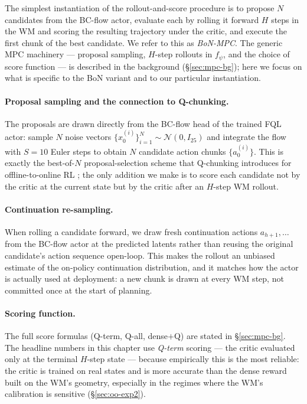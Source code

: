 The simplest instantiation of the rollout-and-score procedure is to propose $N$ candidates from the BC-flow actor, evaluate each by rolling it forward $H$ steps in the WM and scoring the resulting trajectory under the critic, and execute the first chunk of the best candidate. We refer to this as \emph{BoN-MPC}. The generic MPC machinery --- proposal sampling, $H$-step rollouts in $f_\psi$, and the choice of score function --- is described in the background (\S\ref{sec:mpc-bg}); here we focus on what is specific to the BoN variant and to our particular instantiation.

\paragraph{Proposal sampling and the connection to Q-chunking.} The proposals are drawn directly from the BC-flow head of the trained FQL actor: sample $N$ noise vectors $\{x_0^{(i)}\}_{i=1}^N \sim \mathcal{N}(0, I_{25})$ and integrate the flow with $S = 10$ Euler steps to obtain $N$ candidate action chunks $\{a_0^{(i)}\}$. This is exactly the best-of-$N$ proposal-selection scheme that Q-chunking introduces for offline-to-online RL \cite{li2025reinforcement}; the only addition we make is to score each candidate not by the critic at the current state but by the critic after an $H$-step WM rollout.

\paragraph{Continuation re-sampling.} When rolling a candidate forward, we draw fresh continuation actions $a_{h+1}, \dots$ from the BC-flow actor at the predicted latents rather than reusing the original candidate's action sequence open-loop. This makes the rollout an unbiased estimate of the on-policy continuation distribution, and it matches how the actor is actually used at deployment: a new chunk is drawn at every WM step, not committed once at the start of planning.

\paragraph{Scoring function.} The full score formulas (Q-term, Q-all, dense$+$Q) are stated in \S\ref{sec:mpc-bg}. The headline numbers in this chapter use \emph{Q-term} scoring --- the critic evaluated only at the terminal $H$-step state --- because empirically this is the most reliable: the critic is trained on real states and is more accurate than the dense reward built on the WM's geometry, especially in the regimes where the WM's calibration is sensitive (\S\ref{sec:oo-exp2}).

